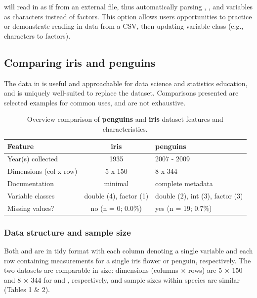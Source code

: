 will read in  as if from an external file, thus
automatically parsing , , and 
variables as characters instead of factors. This option allows users
opportunities to practice or demonstrate reading in data from a CSV,
then updating variable class (e.g., characters to factors).

\hypertarget{comparing-iris-and-penguins}{%
\subsection{\texorpdfstring{Comparing \textbf{iris} and
\textbf{penguins}}{Comparing iris and penguins}}\label{comparing-iris-and-penguins}}

The  data in  is useful and
approachable for data science and statistics education, and is uniquely
well-suited to replace the  dataset. Comparisons presented
are selected examples for common  uses, and are not
exhaustive.

\begin{Schunk}
\begin{table}

\caption{\label{tab:unnamed-chunk-4}Overview comparison of \textbf{penguins} and \textbf{iris} dataset features and characteristics.}
\centering
\begin{tabular}[t]{lcl}
\toprule
Feature & iris & penguins\\
\midrule
Year(s) collected & 1935 & 2007 - 2009\\
Dimensions (col x row) & 5 x 150 & 8 x 344\\
Documentation & minimal & complete metadata\\
Variable classes & double (4), factor (1) & double (2), int (3), factor (3)\\
Missing values? & no (n = 0; 0.0\%) & yes (n = 19; 0.7\%)\\
\bottomrule
\end{tabular}
\end{table}

\end{Schunk}

\hypertarget{data-structure-and-sample-size}{%
\subsubsection{Data structure and sample
size}\label{data-structure-and-sample-size}}

Both  and  are in tidy format
\citep{wickham_tidy_2014} with each column denoting a single variable
and each row containing measurements for a single iris flower or
penguin, respectively. The two datasets are comparable in size:
dimensions (columns × rows) are 5 × 150 and 8 × 344 for  and
, respectively, and sample sizes within species are
similar (Tables 1 \& 2).

